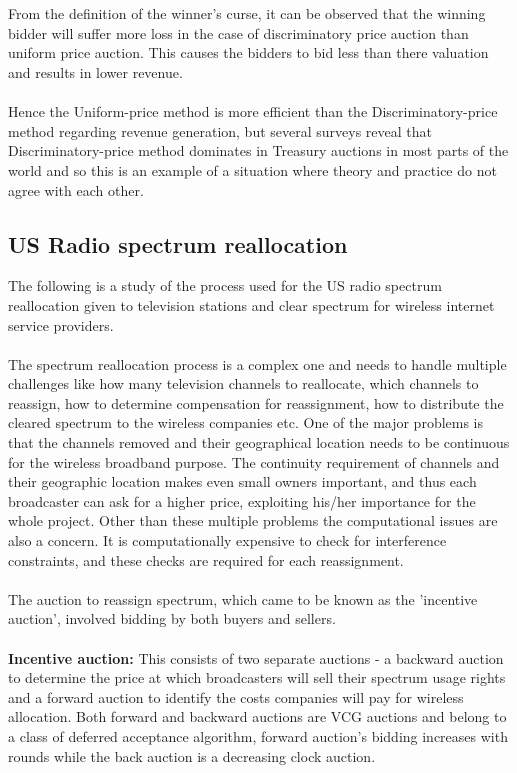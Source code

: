 \documentclass[a4paper]{article}
\begin{document}
\\\\
From the definition of the winner's curse, it can be observed that the winning bidder will suffer more loss in the case of discriminatory price auction than uniform price auction. This causes the bidders to bid less than there valuation and results in lower revenue.
\\\\
Hence the Uniform-price method is more efficient than the Discriminatory-price method regarding revenue generation, but several surveys reveal that Discriminatory-price method dominates in Treasury auctions in most parts of the world and so this is an example of a situation where theory and practice do not agree with each other.

\pagebreak
\subsection*{US Radio spectrum reallocation \cite{radio_spectrum} }

The following is a study of the process used for the US radio spectrum reallocation given to television stations and clear spectrum for wireless internet service providers.
\\\\
The spectrum reallocation process is a complex one and needs to handle multiple challenges like how many television channels to reallocate, which channels to reassign, how to determine compensation for reassignment, how to distribute the cleared spectrum to the wireless companies etc. One of the major problems is that the channels removed and their geographical location needs to be continuous for the wireless broadband purpose. The continuity requirement of channels and their geographic location makes even small owners important, and thus each broadcaster can ask for a higher price, exploiting his/her importance for the whole project. Other than these multiple problems the computational issues are also a concern. It is computationally expensive to check for interference constraints, and these checks are required for each reassignment.
\\\\
The auction to reassign spectrum, which came to be known as the 'incentive auction', involved bidding by both buyers and sellers.
\\\\
\textbf{Incentive auction:} This consists of two separate auctions - a backward auction to determine the price at which broadcasters will sell their spectrum usage rights and a forward auction to identify the costs companies will pay for wireless allocation. Both forward and backward auctions are VCG auctions and belong to a class of deferred acceptance algorithm, forward auction's bidding increases with rounds while the back auction is a decreasing clock auction.
\end{document}
